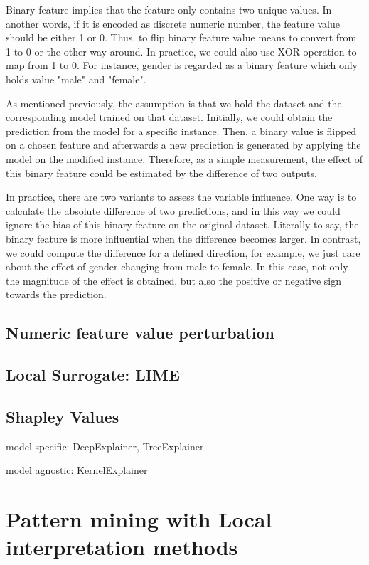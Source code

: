 Binary feature implies that the feature only contains two unique values. In another words, if it is encoded as discrete numeric number, the feature value should be either 1 or 0. Thus, to flip binary feature value means to convert from 1 to 0 or the other way around. In practice, we could also use XOR operation to map from 1 to 0. For instance, gender is regarded as a binary feature which only holds value "male" and "female". 

As mentioned previously, the assumption is that we hold the dataset and the corresponding model trained on that dataset. Initially, we could obtain the prediction from the model for a specific instance. Then, a binary value is flipped on a chosen feature and afterwards a new prediction is generated by applying the model on the modified instance. Therefore, as a simple measurement, the effect of this binary feature could be estimated by the difference of two outputs. 

In practice, there are two variants to assess the variable influence. One way is to calculate the absolute difference of two predictions, and in this way we could ignore the bias of this binary feature on the original dataset. Literally to say, the binary feature is more influential when the difference becomes larger. In contrast, we could compute the difference for a defined direction, for example, we just care about the effect of gender changing from male to female. In this case, not only the magnitude of the effect is obtained, but also the positive or negative sign towards the prediction.  

\subsection{Numeric feature value perturbation}

\subsection{Local Surrogate: LIME}

\subsection{Shapley Values}

model specific: DeepExplainer, TreeExplainer

model agnostic: KernelExplainer

\section{Pattern mining with Local interpretation methods}

